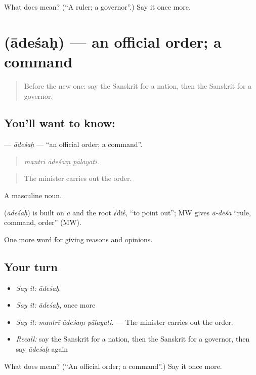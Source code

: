 \begin{tcolorbox}[breakable,colback=teal!4,colframe=teal!35!black,title={Before you move on}]
What does  mean? (\textquotedblleft{}A ruler; a governor\textquotedblright{}.) Say it once more.
\end{tcolorbox}
\section[\texorpdfstring{\sk{आदेशः} (ādeśaḥ)}{आदेशः (ādeśaḥ)}]{ (ādeśaḥ) — an official order; a command}

\label{lesson:SA-C353-adesah}



\begin{quote}
Before the new one: say the Sanskrit for a nation, then the Sanskrit for a governor.
\end{quote}

\subsection*{You'll want to know: }
\textbf{} — \emph{ādeśaḥ} — \textquotedblleft{}an official order; a command\textquotedblright{}.

\begin{quote}
  
\end{quote}

\begin{quote}
\emph{mantrī ādeśaṃ pālayati.}
\end{quote}

\begin{quote}
The minister carries out the order.
\end{quote}

A masculine noun.

\begin{cousinweb}
\textbf{} (\emph{ādeśaḥ}) is built on \emph{ā} and the root √diś, \textquotedblleft{}to point out\textquotedblright{}; MW gives \emph{ā-deśa} \textquotedblleft{}rule, command, order\textquotedblright{} (MW).
\end{cousinweb}

\begin{grammarlens}[title={What you've built}]
One more word for giving reasons and opinions.
\end{grammarlens}

\subsection*{Your turn}
\begin{itemize}
\raggedright
  \item \emph{Say it:} \emph{ādeśaḥ}
  \item \emph{Say it:} \emph{ādeśaḥ}, once more
  \item \emph{Say it:} \emph{mantrī ādeśaṃ pālayati.} — The minister carries out the order.
  \item \emph{Recall:} say the Sanskrit for a nation, then the Sanskrit for a governor, then say \emph{ādeśaḥ} again
\end{itemize}

\begin{tcolorbox}[breakable,colback=teal!4,colframe=teal!35!black,title={Before you move on}]
What does  mean? (\textquotedblleft{}An official order; a command\textquotedblright{}.) Say it once more.
\end{tcolorbox}

